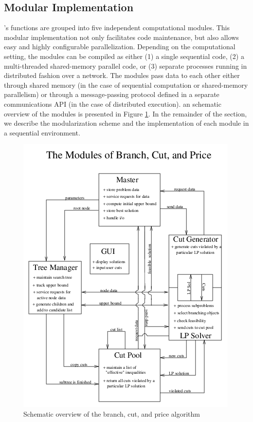 \subsection{Modular Implementation}
\label{SYMPHONY-modules}

\BB's functions are grouped into five independent computational
modules. This modular implementation not only facilitates code
maintenance, but also allows easy and highly configurable
parallelization. Depending on the computational setting, the modules
can be compiled as either (1) a single sequential code, (2) a
multi-threaded shared-memory parallel code, or (3) separate processes
running in distributed fashion over a network. The modules pass data
to each other either through shared memory (in the case of sequential
computation or shared-memory parallelism) or through a message-passing
protocol defined in a separate communications API (in the case of
distributed execution). an schematic overview of the modules is
presented in Figure \ref{overview}. In the remainder of the section,
we describe the modularization scheme and the implementation of each
module in a sequential environment. 

\begin{figure}
\centering
\includegraphics{pbandc}
\caption{Schematic overview of the branch, cut, and price algorithm}
\label{overview}
\end{figure}

